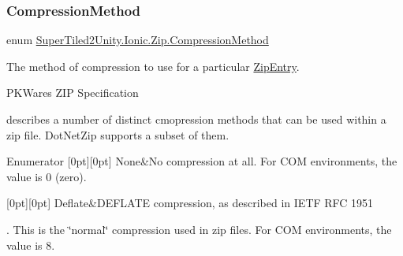 \subsubsection{\texorpdfstring{Compression\+Method}{CompressionMethod}}
{\footnotesize\ttfamily enum \mbox{\hyperlink{namespace_super_tiled2_unity_1_1_ionic_1_1_zip_a48fd7a4529dd87fb2fda54f62ae3d8a3}{Super\+Tiled2\+Unity.\+Ionic.\+Zip.\+Compression\+Method}}\hspace{0.3cm}{\ttfamily [strong]}}



The method of compression to use for a particular \mbox{\hyperlink{class_super_tiled2_unity_1_1_ionic_1_1_zip_1_1_zip_entry}{Zip\+Entry}}. 

P\+K\+Ware\textquotesingle{}s Z\+IP Specification

describes a number of distinct cmopression methods that can be used within a zip file. Dot\+Net\+Zip supports a subset of them. \begin{DoxyEnumFields}{Enumerator}
[0pt][0pt]{}\mbox{\label{namespace_super_tiled2_unity_1_1_ionic_1_1_zip_a48fd7a4529dd87fb2fda54f62ae3d8a3a6adf97f83acf6453d4a6a4b1070f3754}} 
None&No compression at all. For C\+OM environments, the value is 0 (zero). \\
\hline

[0pt][0pt]{}\mbox{\label{namespace_super_tiled2_unity_1_1_ionic_1_1_zip_a48fd7a4529dd87fb2fda54f62ae3d8a3ae2430ff724c45c3d68893fb1a3584426}} 
Deflate&D\+E\+F\+L\+A\+TE compression, as described in I\+E\+TF R\+FC 1951

. This is the \char`\"{}normal\char`\"{} compression used in zip files. For C\+OM environments, the value is 8. \\
\hline

\end{DoxyEnumFields}
\mbox{\label{namespace_super_tiled2_unity_1_1_ionic_1_1_zip_aa3f4e8aa12ef827ac72177a49b4e28e6}} 
